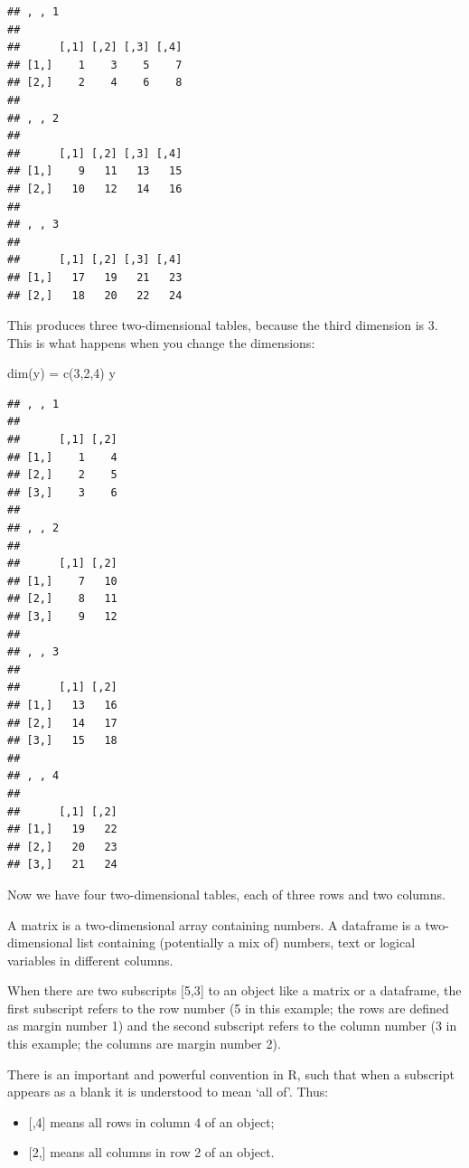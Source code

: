 \documentclass[
]{book}
\newenvironment{Shaded}{\begin{snugshade}}{\end{snugshade}}
\newcommand{\DecValTok}[1]{\textcolor[rgb]{0.00,0.00,0.81}{#1}}
\newcommand{\FunctionTok}[1]{\textcolor[rgb]{0.00,0.00,0.00}{#1}}
\newcommand{\NormalTok}[1]{#1}
\newcommand{\OtherTok}[1]{\textcolor[rgb]{0.56,0.35,0.01}{#1}}
\providecommand{\tightlist}{%
  \setlength{\itemsep}{0pt}\setlength{\parskip}{0pt}}
\theoremstyle{definition}
\theoremstyle{definition}
\theoremstyle{definition}
\theoremstyle{definition}
\theoremstyle{remark}
\begin{document}
\begin{verbatim}
## , , 1
## 
##      [,1] [,2] [,3] [,4]
## [1,]    1    3    5    7
## [2,]    2    4    6    8
## 
## , , 2
## 
##      [,1] [,2] [,3] [,4]
## [1,]    9   11   13   15
## [2,]   10   12   14   16
## 
## , , 3
## 
##      [,1] [,2] [,3] [,4]
## [1,]   17   19   21   23
## [2,]   18   20   22   24
\end{verbatim}

This produces three two-dimensional tables, because the third dimension is 3. This is what happens when you change the dimensions:

\begin{Shaded}
\begin{Highlighting}[]
\FunctionTok{dim}\NormalTok{(y) }\OtherTok{=} \FunctionTok{c}\NormalTok{(}\DecValTok{3}\NormalTok{,}\DecValTok{2}\NormalTok{,}\DecValTok{4}\NormalTok{)}
\NormalTok{y}
\end{Highlighting}
\end{Shaded}

\begin{verbatim}
## , , 1
## 
##      [,1] [,2]
## [1,]    1    4
## [2,]    2    5
## [3,]    3    6
## 
## , , 2
## 
##      [,1] [,2]
## [1,]    7   10
## [2,]    8   11
## [3,]    9   12
## 
## , , 3
## 
##      [,1] [,2]
## [1,]   13   16
## [2,]   14   17
## [3,]   15   18
## 
## , , 4
## 
##      [,1] [,2]
## [1,]   19   22
## [2,]   20   23
## [3,]   21   24
\end{verbatim}

Now we have four two-dimensional tables, each of three rows and two columns.

A matrix is a two-dimensional array containing numbers. A dataframe is a two-dimensional list containing (potentially a mix of) numbers, text or logical variables in different columns.

When there are two subscripts {[}5,3{]} to an object like a matrix or a dataframe, the first subscript refers to the row number (5 in this example; the rows are defined as margin number 1) and the second subscript refers to the column number (3 in this example; the columns are margin number 2).

There is an important and powerful convention in R, such that when a subscript appears as a blank it is understood to mean `all of'. Thus:

\begin{itemize}
\tightlist
\item
  {[},4{]} means all rows in column 4 of an object;
\item
  {[}2,{]} means all columns in row 2 of an object.
\end{itemize}
\end{document}
